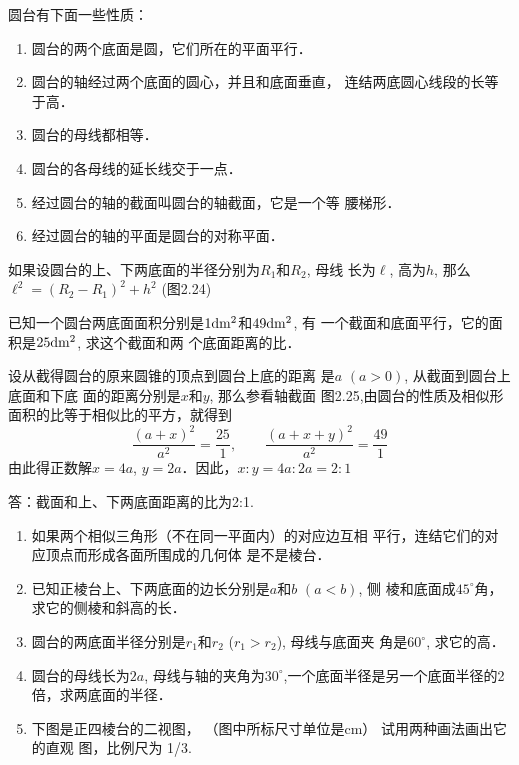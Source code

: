 圆台有下面一些性质：
\begin{enumerate}
\item 圆台的两个底面是圆，它们所在的平面平行．
\item 圆台的轴经过两个底面的圆心，并且和底面垂直，
连结两底圆心线段的长等于高．
\item 圆台的母线都相等．
\item 圆台的各母线的延长线交于一点．
\item 经过圆台的轴的截面叫圆台的轴截面，它是一个等
腰梯形．
\item 经过圆台的轴的平面是圆台的对称平面．
\end{enumerate}

如果设圆台的上、下两底面的半径分别为$R_1$和$R_2$, 母线
长为$\ell$, 高为$h$, 那么$\ell^2=(R_2-R_1)^2+h^2$ (图2.24)

\begin{example}
    已知一个圆台两底面面积分别是$1{\rm dm^2}$和$49{\rm dm^2}$, 有
    一个截面和底面平行，它的面积是$25{\rm dm^2}$, 求这个截面和两
    个底面距离的比．
\end{example}

\begin{figure}[htp]
    \centering
{}
    \caption{}
\end{figure}

\begin{solution}
    设从截得圆台的原来圆锥的顶点到圆台上底的距离
是$a$ $(a>0)$, 从截面到圆台上底面和下底
面的距离分别是$x$和$y$, 那么参看轴截面
图2.25,由圆台的性质及相似形面积的比等于相似比的平方，就得到
\[\frac{(a+x)^2}{a^2}=\frac{25}{1},\qquad \frac{(a+x+y)^2}{a^2}=\frac{49}{1}\]
由此得正数解$x=4a$, $y=2a$．因此，$x:y=4a:2a=2:1$

答：截面和上、下两底面距离的比为2:1.
\end{solution}



\begin{ex}
\begin{enumerate}
    \item 如果两个相似三角形（不在同一平面内）的对应边互相
    平行，连结它们的对应顶点而形成各面所围成的几何体
    是不是棱台．
    \item 已知正棱台上、下两底面的边长分别是$a$和$b$ $(a<b)$, 侧
    棱和底面成$45^{\circ}$角，求它的侧棱和斜高的长．
    \item 圆台的两底面半径分别是$r_1$和$r_2$ ($r_1>r_2$), 母线与底面夹
    角是$60^{\circ}$, 求它的高．
    \item 圆台的母线长为$2a$, 母线与轴的夹角为$30^{\circ}$,一个底面半径是另一个底面半径的2倍，求两底面的半径．
    \item 下图是正四棱台的二视图，
    （图中所标尺寸单位是cm）
    试用两种画法画出它的直观
    图，比例尺为
    1/3.
\end{enumerate}
\end{ex}

